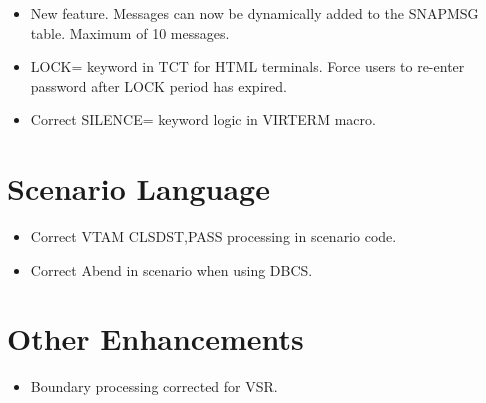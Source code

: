\documentclass[letterpaper,10pt,english]{sphinxmanual}
\begin{document}
\begin{itemize}
\item {} 
New feature. Messages can now be dynamically added to the SNAPMSG table. Maximum of 10 messages.

\end{itemize}

\begin{itemize}
\item {} 
LOCK= keyword in TCT for HTML terminals. Force users to re-enter password after LOCK period has expired.

\end{itemize}

\begin{itemize}
\item {} 
Correct SILENCE= keyword logic in VIRTERM macro.

\end{itemize}

\newpage


\section{Scenario Language}
\label{\detokenize{TN202101:scenario-language}}
\begin{itemize}
\item {} 
Correct VTAM CLSDST,PASS processing in scenario code.

\end{itemize}

\begin{itemize}
\item {} 
Correct Abend in scenario when using DBCS.

\end{itemize}

\newpage


\section{Other Enhancements}
\label{\detokenize{TN202101:other-enhancements}}
\begin{itemize}
\item {} 
Boundary processing corrected for VSR.

\end{itemize}
\end{document}
